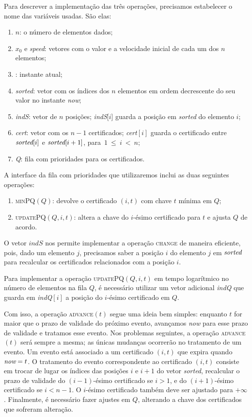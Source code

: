 Para descrever a implementação das três operações, precisamos
estabelecer o nome das variáveis usadas. São elas:
\begin{enumerate}
    \item $n$: o número de elementos dados;
    \item $x_0$ e \textit{speed}: vetores com o valor e a
    velocidade inicial de cada um dos $n$ elementos;
    \item \now: instante atual;
    \item \textit{sorted}: vetor com os índices dos $n$
    elementos em ordem decrescente do seu valor no instante
    \textit{now};
    \item \textit{indS}: vetor de $n$ posições; \textit{indS}[$i$]
    guarda a posição em \textit{sorted} do elemento $i$;
    \item \textit{cert}: vetor com os $n-1$ certificados;
    \textit{cert}$[i]$ guarda o certificado entre $\textit{sorted}[i]$ e
    ${\textit{sorted}[i+1]}$, para~$1~\leq~i~<~n$;
    \item \textit{Q}: fila com prioridades para os certificados.
\end{enumerate}

A interface da fila com prioridades que utilizaremos inclui as duas
seguintes operações:
\begin{enumerate}
    \item \textsc{minPQ}$(Q)$: devolve o certificado $(i, t)$
    com chave $t$ mínima em $Q$;
    \item \textsc{updatePQ}$(Q, i, t)$: altera a chave do
    $i$-ésimo certificado para $t$ e ajusta $Q$ de acordo.
\end{enumerate}
O vetor $\textit{indS}$ nos permite implementar a operação
\textsc{change} de maneira eficiente, pois, dado um elemento $j$,
precisamos saber a posição $i$ do elemento $j$ em $\textit{sorted}$ para
recalcular os certificados relacionados com a posição $i$.

Para implementar a operação \textsc{updatePQ}$(Q, i, t)$ em tempo
logarítmico no número de elementos na fila $Q$, é necessário
utilizar um vetor adicional \textit{indQ} que guarda em
\textit{indQ}$[i]$ a posição do $i$-ésimo certificado em $Q$.

Com isso, a operação \textsc{advance}$(t)$ segue uma ideia bem
simples: enquanto $t$ for maior que o prazo de validade do próximo
evento, avançamos \textit{now} para esse prazo de validade e
tratamos esse evento. Nos problemas seguintes, a operação
\textsc{advance}$(t)$ será sempre a mesma; as únicas mudanças
ocorrerão no tratamento de um evento. Um evento está associado a um
certificado $(i, t)$ que expira quando $\textit{now} = t$. O tratamento do
evento correspondente ao certificado $(i, t)$ consiste em trocar de
lugar os índices das posições $i$ e $i + 1$ do vetor
\textit{sorted}, recalcular o prazo de validade do $(i-1)$-ésimo
certificado se $i > 1$, e do $(i + 1)$-ésimo certificado se $i < n -
1$. O $i$-ésimo certificado também deve ser ajustado para $+\infty$.
Finalmente, é necessário fazer ajustes em $Q$, alterando a chave dos
certificados que sofreram alteração.

